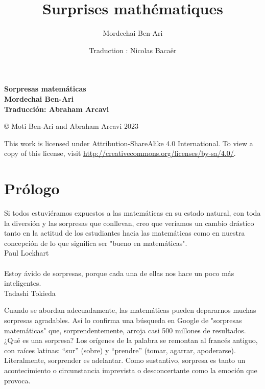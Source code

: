 
\author{Mordechai Ben-Ari}
\title{Surprises mathématiques}
\date{Traduction : Nicolas Bacaër}

\pagestyle{empty}
\begin{center}
\textbf{\huge Sorpresas matemáticas}\\
\vspace{3cm}
\textbf{\Large Mordechai Ben-Ari}\\
\vspace{1cm}
\textbf{\large Traducción: Abraham Arcavi}
\end{center}

\vfill

\begin{center}
\copyright{} Moti Ben-Ari and Abraham Arcavi $2023$
\end{center}
 
\begin{small}
\noindent{}This work is licensed under Attribution-ShareAlike 4.0 International. To view a copy of this license, visit \url{http://creativecommons.org/licenses/by-sa/4.0/}.
\end{small}
%

\chapter*{Prólogo}

\begin{flushright}
\parbox{7cm}{
\begin{footnotesize}
\begin{flushright}
Si todos estuviéramos expuestos a las matemáticas en su estado natural, con toda la diversión y las sorpresas que conllevan, creo que veríamos un cambio drástico tanto en la actitud de los estudiantes hacia las matemáticas como en nuestra concepción de lo que significa ser "bueno en matemáticas".\\
Paul Lockhart\mbox{}\\\mbox{}\\
Estoy ávido de sorpresas, porque cada una de ellas nos hace un poco más inteligentes.\\
Tadashi Tokieda
\end{flushright}
\end{footnotesize}
}
\end{flushright}

\medskip

Cuando se abordan adecuadamente, las matemáticas pueden depararnos muchas sorpresas agradables. Así lo confirma una búsqueda en Google de "sorpresas matemáticas" que, sorprendentemente, arroja casi 500 millones de resultados. ¿Qué es una sorpresa? Los orígenes de la palabra se remontan al francés antiguo, con raíces latinas: ``sur'' (sobre) y ``prendre'' (tomar, agarrar, apoderarse). Literalmente, sorprender es adelantar. Como sustantivo, sorpresa es tanto un acontecimiento o circunstancia imprevista o desconcertante como la emoción que provoca.

